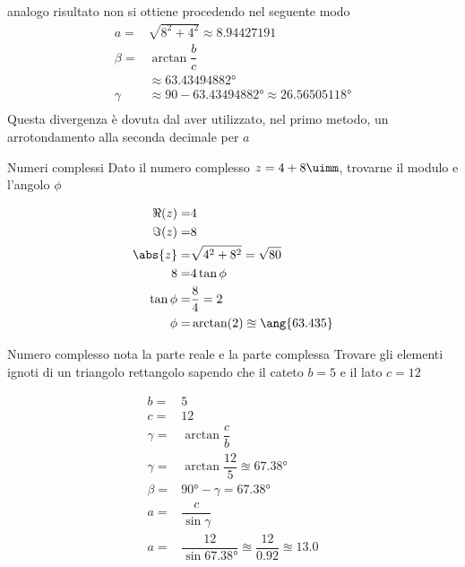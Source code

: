 analogo risultato non si ottiene procedendo nel seguente modo
\begin{align*}
a=&\sqrt{8^2+4^2}\approx\num[round-precision=2,round-mode=places]{8.94427191}\\
\beta=&\arctan\dfrac{b}{c}\\
&\approx\ang[round-precision=2,round-mode=places]{63.43494882}\\
\gamma&\approx90-\ang[round-precision=2,round-mode=places]{63.43494882}\approx\ang[round-precision=2,round-mode=places]{26.56505118}\\
\end{align*}
Questa divergenza è dovuta dal aver utilizzato, nel primo metodo, un arrotondamento alla seconda decimale per $a$
\begin{esempiot}{Numeri complessi}{}
Dato il numero complesso $z=4+8\uimm$, trovarne il modulo e l'angolo $\phi$
\end{esempiot}
\begin{align*}
\Re(z)=&4\\
\Im(z)=&8\\
\abs{z}=&\sqrt{4^2+8^2}=\sqrt{80}\\
8=&4\tan\phi\\
\tan\phi=&\dfrac{8}{4}=2\\
\phi=&\arctan(2)\approxeq\ang{63.435}\\
\end{align*}
\begin{esempiot}{Numero complesso nota la parte reale e la parte complessa}{}
	Trovare gli elementi ignoti di un triangolo rettangolo sapendo che  il cateto $b=5$ e il lato $c=12$
\end{esempiot}
\begin{align*}
b=&5\\
c=&12\\
\gamma=&\arctan\dfrac{c}{b}\\
\gamma=&\arctan\dfrac{12}{5}\approxeq\ang{67.38}\\
\beta=&\ang{90}-\gamma=\ang{67.38}\\
a=&\dfrac{c}{\sin\gamma}\\
a=&\dfrac{12}{\sin\ang{67.38}}\approxeq\dfrac{12}{\num{0.92}}\approxeq\num{13.0}
\end{align*}
